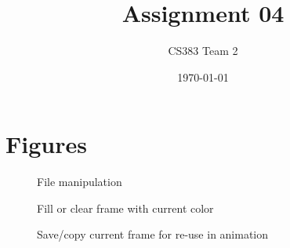 \documentclass[12pt]{article} %
\title{\Huge Assignment 04}
\author{CS383 Team 2}
\date{\today} %
\begin{document}
\lstset{language=Verilog}
\maketitle
\vspace*{40pt}






\newpage
\section{Figures}

\begin{figure}[H]
	\centering
	\caption{File manipulation}
	\label{fig:UC1}
\end{figure}
\begin{figure}[H]
	\centering
	\caption{Fill or clear frame with current color}
	\label{fig:UC2}
\end{figure}
\begin{figure}[H]
	\centering
	\caption{Save/copy current frame for re-use in animation}
	\label{fig:UC3}
\end{figure}
\end{document}
